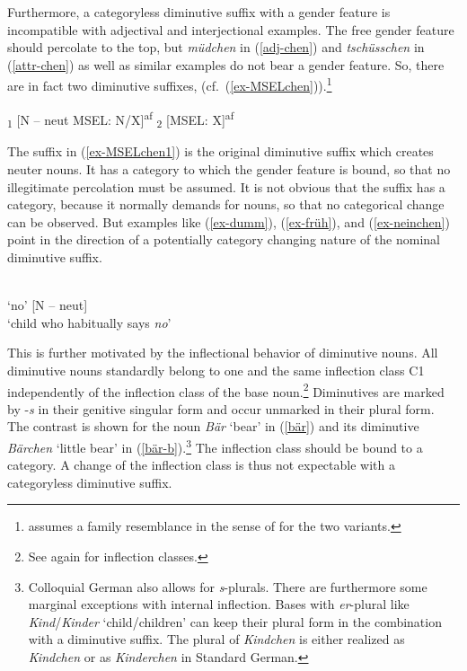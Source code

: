 \documentclass[output=paper
  ,nobabel
  ,draftmode
  ,colorlinks, citecolor=brown
]{langscibook}
\begin{document}
Furthermore, a categoryless diminutive suffix with a gender feature is incompatible with adjectival and interjectional examples. The free gender feature should percolate to the top, but \emph{müdchen} in (\ref{adj-chen}) and \emph{tschüsschen} in (\ref{attr-chen}) as well as similar examples do not bear a gender feature. So, there are in fact two diminutive suffixes, (cf.\ (\ref{ex-MSELchen})).\footnote{\citet{Wiese2006} assumes a family resemblance in the sense of \citet{Wittgenstein1953} for the two variants.}

\eal\label{ex-MSELchen}
\ex\label{ex-MSELchen1}
\textsubscript{1} {[N – neut {\textbar} MSEL: N/X]}\textsuperscript{af}
\ex\label{ex-MSELchen2}
\textsubscript{2} [MSEL: X]\textsuperscript{af}
\zl

\noindent The suffix in (\ref{ex-MSELchen1}) is the original diminutive suffix which creates neuter nouns. It has a category to which the gender feature is bound, so that no illegitimate percolation must be assumed. It is not obvious that the suffix has a category, because it normally demands for nouns, so that no categorical change can be observed. But examples like (\ref{ex-dumm}), (\ref{ex-früh}), and (\ref{ex-neinchen}) point in the direction of a potentially category changing nature of the nominal diminutive suffix.

\eal\label{ex-neinchen}
\ex {}\\ 
    `no' 
\ex {} [N – neut]\\
    `child who habitually says \emph{no}'
\zl

\noindent This is further motivated by the inflectional behavior of diminutive nouns. All diminutive nouns standardly belong to one and the same inflection class C1 independently of the inflection class of the base noun.\footnote{See again \citet[29]{IDS97} for inflection classes.} Diminutives are marked by -\emph{s} in their genitive singular form and occur unmarked in their plural form. The contrast is shown for the noun \emph{Bär} `bear' in (\ref{bär}) and its diminutive \emph{Bärchen} `little bear' in (\ref{bär-b}).\footnote{Colloquial German also allows for \emph{s}-plurals. There are furthermore some marginal exceptions with internal inflection. Bases with \emph{er}-plural like \emph{Kind}/\emph{Kinder} `child/children' can keep their plural form in the combination with a diminutive suffix. The plural of \emph{Kindchen} is either realized as \emph{Kindchen} or as \emph{Kinderchen} in Standard German.} The inflection class should be bound to a category. A change of the inflection class is thus not expectable with a categoryless diminutive suffix.
\end{document}
